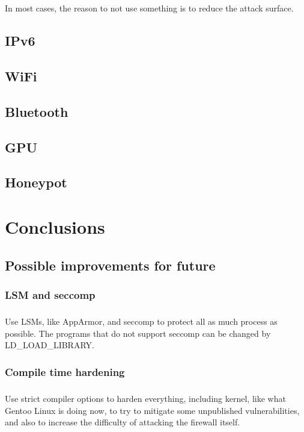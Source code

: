\documentclass[mscthesis]{usiinfthesis}
\begin{document}
\paragraph{}
In most cases, the reason to not use something is to reduce the attack surface.

\section{IPv6}
\section{WiFi}
\section{Bluetooth}
\section{GPU}
\section{Honeypot}

\chapter{Conclusions}

\section{Possible improvements for future}
\subsection{LSM and seccomp}
\paragraph{}
Use LSMs, like AppArmor, and seccomp to protect all as much process as possible. The programs that do not support seccomp can be changed by LD\_LOAD\_LIBRARY.

\subsection{Compile time hardening}
\paragraph{}
Use strict compiler options to harden everything, including kernel, like what Gentoo Linux is doing now, to try to mitigate some unpublished vulnerabilities, and also to increase the difficulty of attacking the firewall itself.
\end{document}
